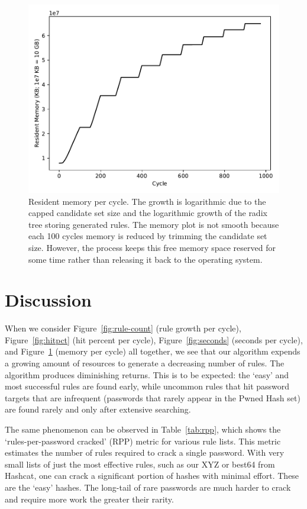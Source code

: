\documentclass[letterpaper,twocolumn,10pt]{article}
\begin{document}
\begin{figure}[h]
\includegraphics[width=\linewidth]
{analysis/passwords-analysis/stats-res_mem_size.pdf}
\caption{Resident memory per cycle. The growth is logarithmic due to the capped
candidate set size and the logarithmic growth of the radix tree storing
generated rules. The memory plot is not smooth because each 100 cycles memory
is reduced by trimming the candidate set size. However, the process keeps this
free memory space reserved for some time rather than releasing it back to the
operating system.}
\label{fig:memory}
\end{figure}

\section{Discussion}
\label{sec:discussion}

When we consider Figure~\ref{fig:rule-count} (rule
growth per cycle), Figure~\ref{fig:hitpct} (hit percent per cycle),
Figure~\ref{fig:seconds} (seconds per cycle), and Figure~\ref{fig:memory}
(memory per cycle) all together, we see that our algorithm expends a growing
amount of resources to generate a decreasing number of rules. The algorithm
produces diminishing returns. This is to be expected: the `easy' and most
successful rules are found early, while uncommon rules that hit password
targets that are infrequent (passwords that rarely appear in the Pwned Hash
set) are found rarely and only after extensive searching.

The same phenomenon can be observed in Table~\ref{tab:rpp}, which shows the
`rules-per-password cracked' (RPP) metric for various rule lists. This metric
estimates the number of rules required to crack a single password. With very
small lists of just the most effective rules, such as our XYZ or best64 from
Hashcat, one can crack a significant portion of hashes with minimal effort.
These are the `easy' hashes. The long-tail of rare passwords are much harder to
crack and require more work the greater their rarity.
\end{document}
